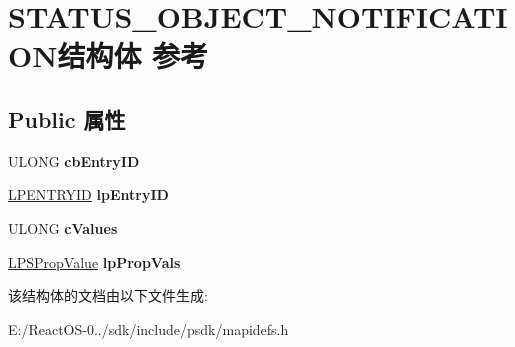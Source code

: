 \hypertarget{struct_s_t_a_t_u_s___o_b_j_e_c_t___n_o_t_i_f_i_c_a_t_i_o_n}{}\section{S\+T\+A\+T\+U\+S\+\_\+\+O\+B\+J\+E\+C\+T\+\_\+\+N\+O\+T\+I\+F\+I\+C\+A\+T\+I\+O\+N结构体 参考}
\label{struct_s_t_a_t_u_s___o_b_j_e_c_t___n_o_t_i_f_i_c_a_t_i_o_n}
\subsection*{Public 属性}
\begin{DoxyCompactItemize}
\item 
\mbox{\label{struct_s_t_a_t_u_s___o_b_j_e_c_t___n_o_t_i_f_i_c_a_t_i_o_n_afdd5f8612e1401fbe9f2b0ff7627cbf0}} 
U\+L\+O\+NG {\bfseries cb\+Entry\+ID}
\item 
\mbox{\label{struct_s_t_a_t_u_s___o_b_j_e_c_t___n_o_t_i_f_i_c_a_t_i_o_n_a6d387496a035c56479497ae7fa8cda2f}} 
\hyperlink{struct___e_n_t_r_y_i_d}{L\+P\+E\+N\+T\+R\+Y\+ID} {\bfseries lp\+Entry\+ID}
\item 
\mbox{\label{struct_s_t_a_t_u_s___o_b_j_e_c_t___n_o_t_i_f_i_c_a_t_i_o_n_a7f895dd32580ec0bd595e7944f75573e}} 
U\+L\+O\+NG {\bfseries c\+Values}
\item 
\mbox{\label{struct_s_t_a_t_u_s___o_b_j_e_c_t___n_o_t_i_f_i_c_a_t_i_o_n_af3b9c2a63fac157ce619967dc364fc53}} 
\hyperlink{struct___s_prop_value}{L\+P\+S\+Prop\+Value} {\bfseries lp\+Prop\+Vals}
\end{DoxyCompactItemize}


该结构体的文档由以下文件生成\+:\begin{DoxyCompactItemize}
\item 
E\+:/\+React\+O\+S-\/0../sdk/include/psdk/mapidefs.\+h\end{DoxyCompactItemize}
